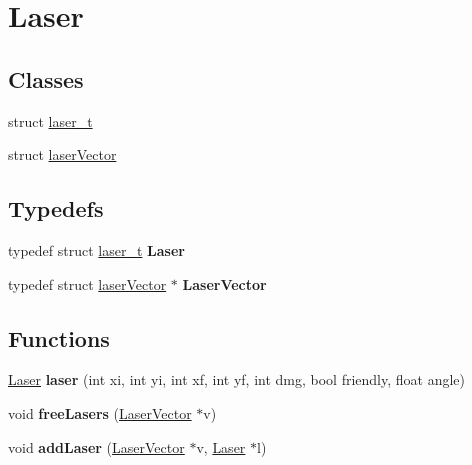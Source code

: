 \hypertarget{group__Laser}{}\section{Laser}
\label{group__Laser}
\subsection*{Classes}
\begin{DoxyCompactItemize}
\item 
struct \hyperlink{structlaser__t}{laser\+\_\+t}
\item 
struct \hyperlink{structlaserVector}{laser\+Vector}
\end{DoxyCompactItemize}
\subsection*{Typedefs}
\begin{DoxyCompactItemize}
\item 
\mbox{\label{group__Laser_ga7f29f0d59eaa73a537c4730685e2bc8a}} 
typedef struct \hyperlink{structlaser__t}{laser\+\_\+t} {\bfseries Laser}
\item 
\mbox{\label{group__Laser_gae9278671a0ad106a5bee249187c81aee}} 
typedef struct \hyperlink{structlaserVector}{laser\+Vector} $\ast$ {\bfseries Laser\+Vector}
\end{DoxyCompactItemize}
\subsection*{Functions}
\begin{DoxyCompactItemize}
\item 
\mbox{\label{group__Laser_ga1371fbb5806a3e803a5805ede9407400}} 
\hyperlink{structlaser__t}{Laser} {\bfseries laser} (int xi, int yi, int xf, int yf, int dmg, bool friendly, float angle)
\item 
\mbox{\label{group__Laser_gad6901fbda56a888749506b0d41679cbc}} 
void {\bfseries free\+Lasers} (\hyperlink{structlaserVector}{Laser\+Vector} $\ast$v)
\item 
\mbox{\label{group__Laser_gada5c9a3a039b17204b14d8d7d40eda3f}} 
void {\bfseries add\+Laser} (\hyperlink{structlaserVector}{Laser\+Vector} $\ast$v, \hyperlink{structlaser__t}{Laser} $\ast$l)
\end{DoxyCompactItemize}
